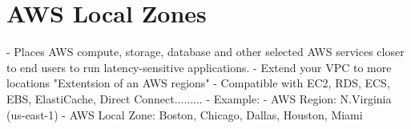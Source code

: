 \section{AWS Local Zones}
- Places AWS compute, storage, database and other selected AWS services closer to end users to run latency-sensitive applications.
- Extend your VPC to more locations "Extentsion of an AWS regions"
- Compatible with EC2, RDS, ECS, EBS, ElastiCache, Direct Connect.........
- Example:
- AWS Region: N.Virginia (us-east-1)
- AWS Local Zone: Boston, Chicago, Dallas, Houston, Miami